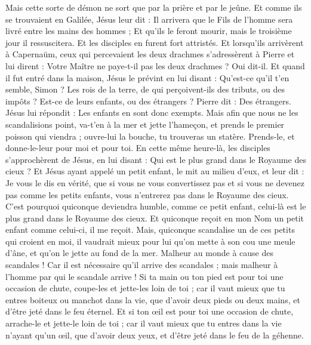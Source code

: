 \begin{multicols}{2}
Mais cette sorte de démon ne sort que par la prière et par le jeûne.
Et comme ils se trouvaient en Galilée, Jésus leur dit : Il arrivera que le Fils de l’homme sera livré entre les mains des hommes ;
Et qu'ils le feront mourir, mais le troisième jour il ressuscitera. Et les disciples en furent fort attristés.
Et lorsqu'ils arrivèrent à Capernaüm, ceux qui percevaient les deux drachmes s'adressèrent à Pierre et lui dirent : Votre Maître ne paye-t-il pas les deux drachmes ?
Oui dit-il. Et quand il fut entré dans la maison, Jésus le prévint en lui disant : Qu'est-ce qu'il t'en semble, Simon ? Les rois de la terre, de qui perçoivent-ils des tributs, ou des impôts ? Est-ce de leurs enfants, ou des étrangers ?
Pierre dit : Des étrangers. Jésus lui répondit : Les enfants en sont donc exempts.
Mais afin que nous ne les scandalisions point, va-t'en à la mer et jette l'hameçon, et prends le premier poisson qui viendra ; ouvre-lui la bouche, tu trouveras un statère. Prends-le, et donne-le-leur pour moi et pour toi.
\VerseOne{}En cette même heure-là, les disciples s’approchèrent de Jésus, en lui disant : Qui est le plus grand dans le Royaume des cieux ?
Et Jésus ayant appelé un petit enfant, le mit au milieu d'eux,
et leur dit : Je vous le dis en vérité, que si vous ne vous convertissez pas et si vous ne devenez pas comme les petits enfants, vous n'entrerez pas dans le Royaume des cieux.
C'est pourquoi quiconque deviendra humble, comme ce petit enfant, celui-là est le plus grand dans le Royaume des cieux.
Et quiconque reçoit en mon Nom un petit enfant comme celui-ci, il me reçoit.
Mais, quiconque scandalise un de ces petits qui croient en moi, il vaudrait mieux pour lui qu'on mette à son cou une meule d'âne, et qu'on le jette au fond de la mer.
Malheur au monde à cause des scandales ! Car il est nécessaire qu'il arrive des scandales ; mais malheur à l'homme par qui le scandale arrive !
Si ta main ou ton pied est pour toi une occasion de chute, coupe-les et jette-les loin de toi ; car il vaut mieux que tu entres boiteux ou manchot dans la vie, que d'avoir deux pieds ou deux mains, et d'être jeté dans le feu éternel.
Et si ton œil est pour toi une occasion de chute, arrache-le et jette-le loin de toi ; car il vaut mieux que tu entres dans la vie n'ayant qu'un œil, que d'avoir deux yeux, et d'être jeté dans le feu de la géhenne.

\end{multicols}
